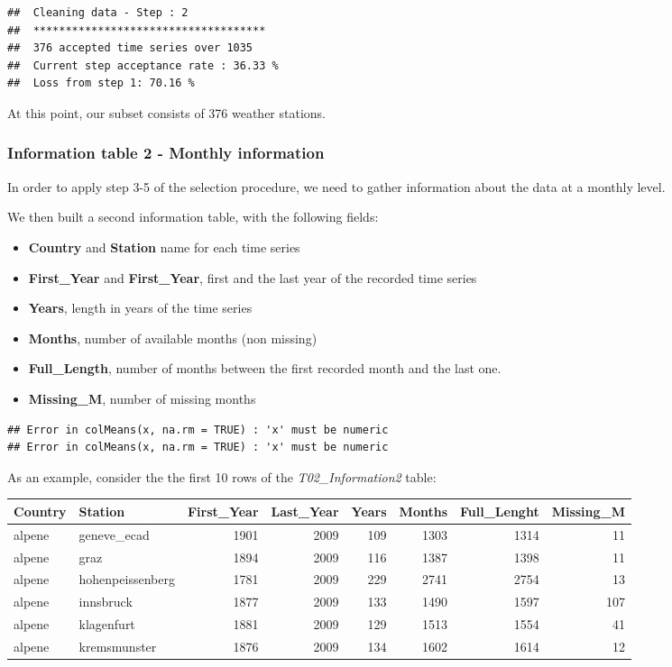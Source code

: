 \documentclass[]{article}
\begin{document}
\begin{verbatim}
##  Cleaning data - Step : 2 
##  ************************************ 
##  376 accepted time series over 1035 
##  Current step acceptance rate : 36.33 % 
##  Loss from step 1: 70.16 %
\end{verbatim}

At this point, our subset consists of 376 weather stations.

\hypertarget{information-table-2---monthly-information}{%
\subsubsection{Information table 2 - Monthly
information}\label{information-table-2---monthly-information}}

In order to apply step 3-5 of the selection procedure, we need to gather
information about the data at a monthly level.

We then built a second information table, with the following fields:

\begin{itemize}
\item
  \textbf{Country} and \textbf{Station} name for each time series
\item
  \textbf{First\_Year} and \textbf{First\_Year}, first and the last year
  of the recorded time series
\item
  \textbf{Years}, length in years of the time series
\item
  \textbf{Months}, number of available months (non missing)
\item
  \textbf{Full\_Length}, number of months between the first recorded
  month and the last one.
\item
  \textbf{Missing\_M}, number of missing months
\end{itemize}

\begin{verbatim}
## Error in colMeans(x, na.rm = TRUE) : 'x' must be numeric
## Error in colMeans(x, na.rm = TRUE) : 'x' must be numeric
\end{verbatim}

As an example, consider the the first 10 rows of the
\emph{T02\_Information2} table:

\begin{longtable}[]{@{}llrrrrrr@{}}
\toprule
Country & Station & First\_Year & Last\_Year & Years & Months &
Full\_Lenght & Missing\_M\tabularnewline
\midrule
\endhead
alpene & geneve\_ecad & 1901 & 2009 & 109 & 1303 & 1314 &
11\tabularnewline
alpene & graz & 1894 & 2009 & 116 & 1387 & 1398 & 11\tabularnewline
alpene & hohenpeissenberg & 1781 & 2009 & 229 & 2741 & 2754 &
13\tabularnewline
alpene & innsbruck & 1877 & 2009 & 133 & 1490 & 1597 &
107\tabularnewline
alpene & klagenfurt & 1881 & 2009 & 129 & 1513 & 1554 &
41\tabularnewline
alpene & kremsmunster & 1876 & 2009 & 134 & 1602 & 1614 &
12\tabularnewline
\bottomrule
\end{longtable}
\end{document}
